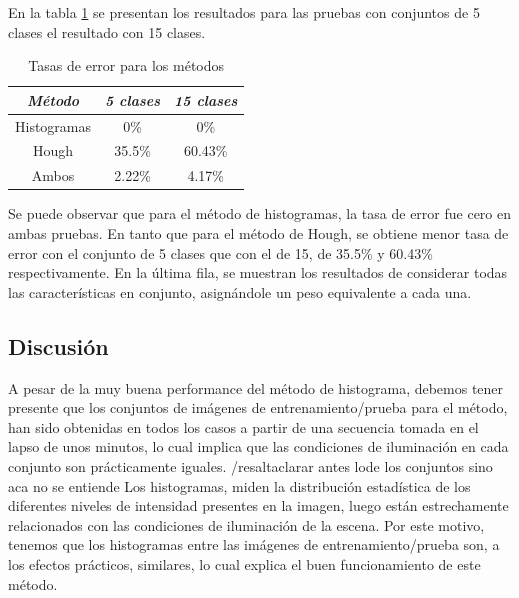 \documentclass[conference,spanish,a4paper,10pt,oneside,final]{tfmpd}
\begin{document}
%

En la tabla \ref{tablaerrores} se presentan los resultados para las pruebas
con conjuntos de 5 clases%
el resultado con
15 clases. 
%
%
\begin{table}
\caption{Tasas de error para los métodos}
\begin{center}\begin{tabular}{ccc}
\hline \emph{Método} & \emph{5 clases} & \emph{15 clases}\\ 
\hline Histogramas & 0\% & 0\%\\ 
\hline Hough & 35.5\% & 60.43\%\\ 
\hline Ambos & 2.22\% & 4.17\%\\ 
\hline 
\end{tabular}\end{center}
\label{tablaerrores}
\end{table}
%
Se puede observar que para el método de histogramas, la tasa de error fue cero
en ambas pruebas. En tanto que para el método de Hough, se obtiene menor tasa de
error con el conjunto de 5 clases que con el de 15, de 35.5\% y 60.43\%
respectivamente. En la última fila, se muestran los resultados de considerar todas
las características en conjunto, asignándole un peso equivalente a cada una. 

%
%
\subsection{Discusión}
A pesar de la muy buena performance del método de histograma, debemos tener
presente que los conjuntos de imágenes de entrenamiento/prueba para el método, 
han sido obtenidas en todos los casos a partir de una secuencia tomada en el 
lapso de unos minutos, lo cual implica que las condiciones de iluminación en
cada conjunto son prácticamente iguales. /resalt{aclarar antes lode los conjuntos sino aca no se entiende}
Los histogramas, miden la distribución estadística de los diferentes niveles
de intensidad presentes en la imagen, luego están estrechamente relacionados
con las condiciones de iluminación de la escena. Por este motivo, tenemos
que los histogramas entre las imágenes de entrenamiento/prueba son, a los
efectos prácticos, similares, lo cual explica el buen funcionamiento de este
método.
\end{document}

